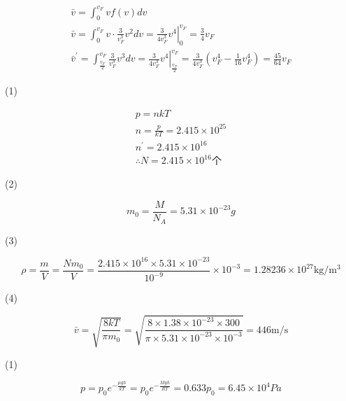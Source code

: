 \documentclass[b5paper,opensource]{./template/qyxf-book}
\begin{document}
$$
\begin{array} { c }
 { \bar { v } = \int _ { 0 } ^ { v _ { F } } v f ( v ) d v } \\
{ \bar { v } = \int _ { 0 } ^ { v _ { F } } v \cdot \frac { 3 } { v _ { F } ^ { 3 } } v ^ { 2 } d v = \left. \frac { 3 } { 4 v _ { F } ^ { 3 } } v ^ { 4 } \right| _ { 0 } ^ { v _ { F } } = \frac { 3 } { 4 } v _ { F } } \\ { \bar { v } ^ { \prime } = \int _ { \frac { v _ { F } } { 2 } } ^ { v _ { F } } \frac { 3 } { v _ { F } ^ { 3 } } v ^ { 3 } d v = \left. \frac { 3 } { 4 v _ { F } ^ { 3 } } v ^ { 4 } \right| _ { \frac { v _ { F } } { 2 } } ^ { v _ { F } } = \frac { 3 } { 4 v _ { F } ^ { 3 } } \left( v _ { F } ^ { 4 } - \frac { 1 } { 16 } v _ { F } ^ { 4 } \right) = \frac { 45 } { 64 } v _ { F } }
\end{array}
$$


\solve
(1)

$$
\begin{array} { c } { p = n k T } \\ 
{ n = \frac { p } { k T } = 2.415 \times 10 ^ { 25 } } \\ 
{ n ^ { \prime } = 2.415 \times 10 ^ { 16 } } \\
 { \therefore N = 2.415 \times 10 ^ { 16 } \mbox{个} } 
\end{array}
$$

(2)

$$
m _ { 0 } = \frac { M } { N _ { A } } = 5.31 \times 10 ^ { - 23 } g
$$

(3)

$$
\rho = \frac { m } { V } = \frac { N m _ { 0 } } { V } = \frac { 2.415 \times 10 ^ { 16 } \times 5.31 \times 10 ^ { - 23 } } { 10 ^ { - 9 } } \times 10 ^ { - 3 } = 1.28236 \times 10 ^ { 27 } \mathrm { kg } / \mathrm { m } ^ { 3 }
$$

(4)

$$
\bar { v } = \sqrt { \frac { 8 k T } { \pi m _ { 0 } } } = \sqrt { \frac { 8 \times 1.38 \times 10 ^ { - 23 } \times 300 } { \pi \times 5.31 \times 10 ^ { - 23 } \times 10 ^ { - 3 } } } = 446 \mathrm { m } / \mathrm { s }
$$



\solve

(1)

$$
p = p _ { 0 } e ^ { - \frac { \mu g h } { k T } } = p _ { 0 } e ^ { - \frac { M g h } { R T } } = 0.633 p _ { 0 } = 6.45 \times 10 ^ { 4 } P a
$$
\end{document}
